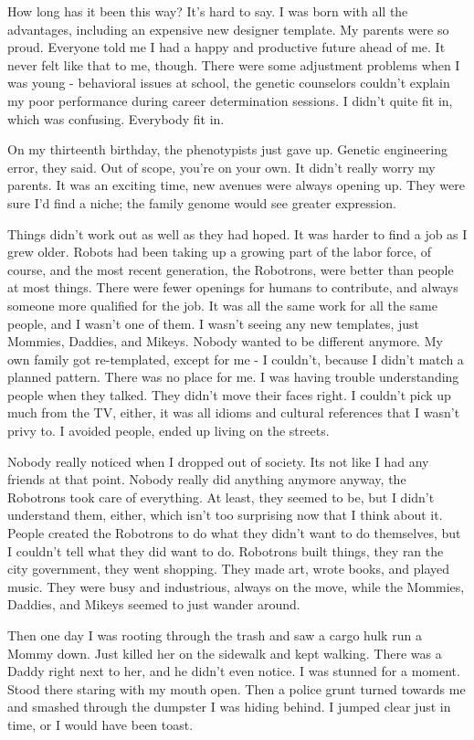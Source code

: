 \documentclass{amsbook}
\begin{document}
How long has it been this way?  It's hard to say.  I was born with all the advantages, including an expensive new designer template.  My parents were so proud.  Everyone told me I had a happy and productive future ahead of me.  It never felt like that to me, though.  There were some adjustment problems when I was young - behavioral issues at school, the genetic counselors couldn't explain my poor performance during career determination sessions.  I didn't quite fit in, which was confusing.  Everybody fit in.

On my thirteenth birthday, the phenotypists just gave up.  Genetic engineering error, they said.  Out of scope, you're on your own.  It didn't really worry my parents.  It was an exciting time, new avenues were always opening up.  They were sure I'd find a niche; the family genome would see greater expression.

Things didn't work out as well as they had hoped.  It was harder to find a job as I grew older.  Robots had been taking up a growing part of the labor force, of course, and the most recent generation, the Robotrons, were better than people at most things.  There were fewer openings for humans to contribute, and always someone more qualified for the job.  It was all the same work for all the same people, and I wasn't one of them.  I wasn't seeing any new templates, just Mommies, Daddies, and Mikeys.  Nobody wanted to be different anymore.  My own family got re-templated, except for me - I couldn't, because I didn't match a planned pattern.  There was no place for me.  I was having trouble understanding people when they talked.  They didn't move their faces right.  I couldn't pick up much from the TV, either, it was all idioms and cultural references that I wasn't privy to.  I avoided people, ended up living on the streets.

Nobody really noticed when I dropped out of society.  Its not like I had any friends at that point.  Nobody really did anything anymore anyway, the Robotrons took care of everything.  At least, they seemed to be, but I didn't understand them, either, which isn't too surprising now that I think about it.  People created the Robotrons to do what they didn't want to do themselves, but I couldn't tell what they did want to do.  Robotrons built things, they ran the city government, they went shopping.  They made art, wrote books, and played music.  They were busy and industrious, always on the move, while the Mommies, Daddies, and Mikeys seemed to just wander around.

Then one day I was rooting through the trash and saw a cargo hulk run a Mommy down.  Just killed her on the sidewalk and kept walking.  There was a Daddy right next to her, and he didn't even notice.  I was stunned for a moment.  Stood there staring with my mouth open.  Then a police grunt turned towards me and smashed through the dumpster I was hiding behind.  I jumped clear just in time, or I would have been toast.
\end{document}
